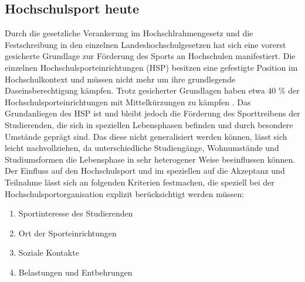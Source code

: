 \subsection{Hochschulsport heute}
Durch die gesetzliche Verankerung im Hochschlrahmengesetz und die Festschreibung in den einzelnen Landeshochschulgesetzen hat sich eine vorerst gesicherte Grundlage zur Förderung des Sports an Hochschulen manifestiert. Die einzelnen Hochschulsporteinrichtungen (HSP) besitzen eine gefestigte Position im Hochschulkontext und müssen nicht mehr um ihre grundlegende Daseinsberechtigung kämpfen. Trotz gesicherter Grundlagen haben etwa 40  \% der Hochschulsporteinrichtungen mit Mittelkürzungen zu kämpfen \cite[][S.9]{Hachmeister.2004}.
Das Grundanliegen des HSP ist und bleibt jedoch die Förderung des Sporttreibens der Studierenden, die sich in speziellen Lebensphasen befinden und durch besondere Umstände geprägt sind. Das diese nicht generalisiert werden können, lässt sich leicht nachvollziehen, da unterschiedliche Studiengänge, Wohnumstände und Studiumsformen die Lebensphase in sehr heterogener Weise beeinflussen können. Der Einfluss auf den Hochschulsport und im speziellen auf die Akzeptanz und Teilnahme lässt sich an folgenden Kriterien festmachen, die speziell bei der Hochschulsportorganisation explizit berücksichtigt werden müssen:

\begin{enumerate}
	\item Sportinteresse des Studierenden
	\item Ort der Sporteinrichtungen
	\item Soziale Kontakte
	\item Belastungen und Entbehrungen
\end{enumerate}

